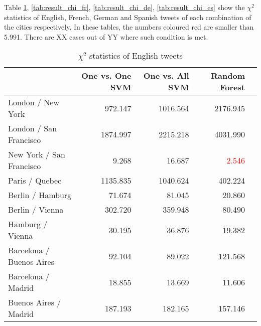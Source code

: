 Table \ref{tab:result_chi_en}, \ref{tab:result_chi_fr}, \ref{tab:result_chi_de}, \ref{tab:result_chi_es} show the $\chi^2$ statistics of English, French, German and Spanish tweets of each combination of the cities respectively.
In these tables, the numbers coloured red are smaller than 5.991.
There are XX cases out of YY where such condition is met.

\begin{table}[ht]
	\caption{$\chi^2$ statistics of English tweets}
	\begin{tabular}{|l|r|r|r|r|} \hline
	{}&One vs. One SVM &One vs. All SVM&Random Forest\\ \hline
	London / New York & 972.147 & 1016.564 & 2176.945 \\ \hline
	London / San Francisco & 1874.997 & 2215.218 & 4031.990 \\ \hline
	New York / San Francisco & 9.268 & 16.687 & \textcolor{red}{2.546} \\ \hline
	Paris / Quebec & 1135.835 & 1040.624 & 402.224 \\ \hline
	Berlin / Hamburg & 71.674 & 81.045 & 20.860 \\ \hline
	Berlin / Vienna & 302.720 & 359.948 & 80.490\\ \hline
	Hamburg / Vienna & 30.195 & 36.876 & 19.382 \\ \hline
	Barcelona / Buenos Aires & 92.104 & 89.022 & 121.568 \\ \hline
	Barcelona / Madrid & 18.855 & 13.669 & 11.606 \\ \hline
	Buenos Aires / Madrid & 187.193 & 182.165 & 157.146 \\ \hline
	\end{tabular}
	\label{tab:result_chi_en}
\end{table}


